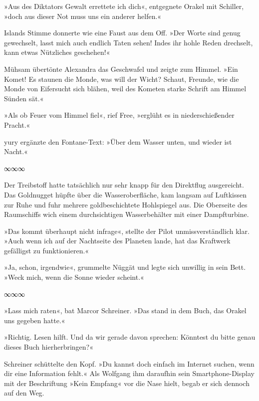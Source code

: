 »Aus des Diktators Gewalt errettete ich dich«, entgegnete Orakel mit Schiller, »doch aus dieser Not muss uns ein anderer helfen.«

Islands Stimme donnerte wie eine Faust aus dem Off. »Der Worte sind genug gewechselt, lasst mich auch endlich Taten sehen! Indes ihr hohle Reden drechselt, kann etwas Nützliches geschehen!«

Mühsam übertönte Alexandra das Geschwafel und zeigte zum Himmel. »Ein Komet! Es staunen die Monde, was will der Wicht? Schaut, Freunde, wie die Monde von Eifersucht sich blähen, weil des Kometen starke Schrift am Himmel Sünden sät.«

»Als ob Feuer vom Himmel fiel«, rief Free, »erglüht es in niederschießender Pracht.«

yury ergänzte den Fontane-Text: »Über dem Wasser unten, und wieder ist Nacht.«

\begin{center}
∞∞∞
\end{center}

Der Treibstoff hatte tatsächlich nur sehr knapp für den Direktflug ausgereicht. Das Goldnugget hüpfte über die Wasseroberfläche, kam langsam auf Luftkissen zur Ruhe und fuhr mehrere goldbeschichtete Hohlspiegel aus. Die Oberseite des Raumschiffs wich einem durchsichtigen Wasserbehälter mit einer Dampfturbine.


»Das kommt überhaupt nicht infrage«, stellte der Pilot unmissverständlich klar. »Auch wenn ich auf der Nachtseite des Planeten lande, hat das Kraftwerk gefälligst zu funktionieren.«


»Ja, schon, irgendwie«, grummelte Nüggät und legte sich unwillig in sein Bett. »Weck mich, wenn die Sonne wieder scheint.«

\begin{center}
∞∞∞
\end{center}

»Lass mich raten«, bat Marcor Schreiner. »Das stand in dem Buch, das Orakel uns gegeben hatte.«

»Richtig. Lesen hilft. Und da wir gerade davon sprechen: Könntest du bitte genau dieses Buch hierherbringen?«

Schreiner schüttelte den Kopf. »Du kannst doch einfach im Internet suchen, wenn dir eine Information fehlt.« Als Wolfgang ihm daraufhin sein Smartphone-Display mit der Beschriftung »Kein Empfang« vor die Nase hielt, begab er sich dennoch auf den Weg.

